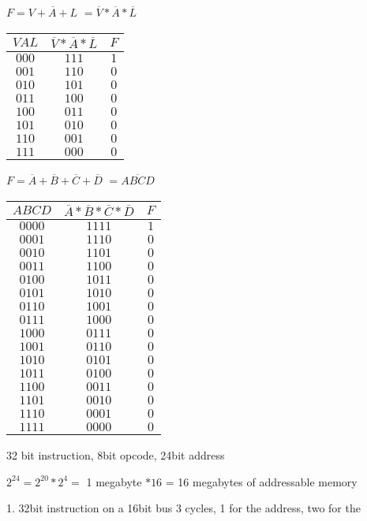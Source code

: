 \documentclass[12pt,largemargins]{homework}
\begin{document}
\begin{alphaparts}
\item
$F=\overline{V+A+L}$
$=\overline{V}*\overline{A}*\overline{L}$\\
\begin{tabular}{|c|c|c|}
\hline
$VAL$ & $\overline{V}*\overline{A}*\overline{L}$ & $F$\\
\hline
$000$ & $111$ & $ 1 $ \\
$001$ & $110$ & $ 0 $ \\
$010$ & $101$ & $ 0 $ \\
$011$ & $100$ & $ 0 $ \\
$100$ & $011$ & $ 0 $ \\
$101$ & $010$ & $ 0 $ \\
$110$ & $001$ & $ 0 $ \\
$111$ & $000$ & $ 0 $ \\
\hline
\end{tabular}
\item
$F=\overline{A}+\overline{B}+\overline{C}+\overline{D}$
$=\overline{ABCD}$\\
\begin{tabular}{|c|c|c|}
\hline
$ABCD$ & $\overline{A}*\overline{B}*\overline{C}*\overline{D}$ & $F$\\
\hline
$0000$ & $1111$ & $ 1 $ \\
$0001$ & $1110$ & $ 0 $ \\
$0010$ & $1101$ & $ 0 $ \\
$0011$ & $1100$ & $ 0 $ \\
$0100$ & $1011$ & $ 0 $ \\
$0101$ & $1010$ & $ 0 $ \\
$0110$ & $1001$ & $ 0 $ \\
$0111$ & $1000$ & $ 0 $ \\
$1000$ & $0111$ & $ 0 $ \\
$1001$ & $0110$ & $ 0 $ \\
$1010$ & $0101$ & $ 0 $ \\
$1011$ & $0100$ & $ 0 $ \\
$1100$ & $0011$ & $ 0 $ \\
$1101$ & $0010$ & $ 0 $ \\
$1110$ & $0001$ & $ 0 $ \\
$1111$ & $0000$ & $ 0 $ \\

\hline
\end{tabular}
\end{alphaparts}

32 bit instruction, 8bit opcode, 24bit address\\
\begin{alphaparts}
\item
$2^24=2^20*2^4=$ 1 megabyte $* 16$ = 16 megabytes of addressable memory\\
\item
1. 32bit instruction on a 16bit bus
3 cycles, 1 for the address, two for the 
\end{alphaparts}
\end{document}

